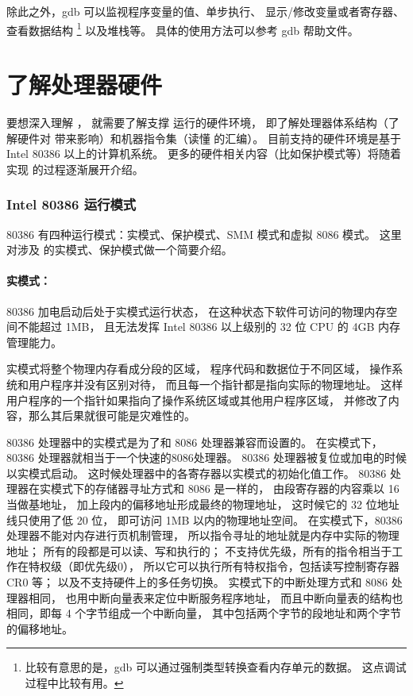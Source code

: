 除此之外，gdb 可以监视程序变量的值、单步执行、
显示/修改变量或者寄存器、查看数据结构
\footnote{比较有意思的是，gdb 可以通过强制类型转换查看内存单元的数据。
这点调试过程中比较有用。}
以及堆栈等。
具体的使用方法可以参考 gdb 帮助文件。

\section{了解处理器硬件}

要想深入理解 \ucore，
就需要了解支撑 \ucore 运行的硬件环境，
即了解处理器体系结构（了解硬件对 \ucore 带来影响）和机器指令集（读懂 \ucore 的汇编）。
\ucore 目前支持的硬件环境是基于 Intel 80386 以上的计算机系统。
更多的硬件相关内容（比如保护模式等）将随着实现 \ucore 的过程逐渐展开介绍。

\subsubsection{Intel 80386 运行模式}

80386 有四种运行模式：实模式、保护模式、SMM 模式和虚拟 8086 模式。
这里对涉及 \ucore 的实模式、保护模式做一个简要介绍。

\paragraph{实模式：}
80386 加电启动后处于实模式运行状态，
在这种状态下软件可访问的物理内存空间不能超过 1MB，
且无法发挥 Intel 80386 以上级别的 32 位 CPU 的 4GB 内存管理能力。

实模式将整个物理内存看成分段的区域，
程序代码和数据位于不同区域，
操作系统和用户程序并没有区别对待，
而且每一个指针都是指向实际的物理地址。
这样用户程序的一个指针如果指向了操作系统区域或其他用户程序区域，
并修改了内容，那么其后果就很可能是灾难性的。

80386 处理器中的实模式是为了和 8086 处理器兼容而设置的。
在实模式下，80386 处理器就相当于一个快速的8086处理器。
80386 处理器被复位或加电的时候以实模式启动。
这时候处理器中的各寄存器以实模式的初始化值工作。
80386 处理器在实模式下的存储器寻址方式和 8086 是一样的，
由段寄存器的内容乘以 16 当做基地址，
加上段内的偏移地址形成最终的物理地址，
这时候它的 32 位地址线只使用了低 20 位，
即可访问 1MB 以内的物理地址空间。
在实模式下，80386处理器不能对内存进行页机制管理，
所以指令寻址的地址就是内存中实际的物理地址；
所有的段都是可以读、写和执行的；
不支持优先级，所有的指令相当于工作在特权级（即优先级0），
所以它可以执行所有特权指令，包括读写控制寄存器 CR0 等；
以及不支持硬件上的多任务切换。
实模式下的中断处理方式和 8086 处理器相同，
也用中断向量表来定位中断服务程序地址，
而且中断向量表的结构也相同，即每 4 个字节组成一个中断向量，
其中包括两个字节的段地址和两个字节的偏移地址。

